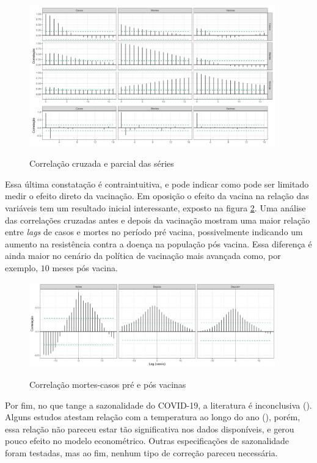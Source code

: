 \documentclass[
    article,
	12pt,				%
	oneside,			%
	a4paper,			%
	english,			%
	brazil,				%
	hyperref = {colorlinks, citecolor=c1d, linkcolor=c2d, urlcolor=c3d, colorlinks}
	]{abntex2}
\begin{document}
\begin{figure}[H]
    \centering
    \caption{Correlação cruzada e parcial das séries}
    \includegraphics[width = 0.95\textwidth]{Figuras/stat_acf.png}
    \label{fig:acfall}
\end{figure}

Essa última constatação é contraintuitiva, e pode indicar como pode ser limitado medir o efeito direto da vacinação. Em oposição o efeito da vacina na relação das variáveis tem um resultado inicial interessante, exposto na figura \ref{fig:ccfad}. Uma análise das correlações cruzadas antes e depois da vacinação mostram uma maior relação entre \textit{lags} de casos e mortes no período pré vacina, possivelmente indicando um aumento na resistência contra a doença na população pós vacina. Essa diferença é ainda maior no cenário da política de vacinação mais avançada como, por exemplo, $10$ meses pós vacina.

\begin{figure}[H]
    \centering
    \caption{Correlação mortes-casos pré e pós vacinas}
    \includegraphics[width = 0.95\textwidth]{Figuras/stat_ba.png}
    \label{fig:ccfad}
\end{figure}

Por fim, no que tange a sazonalidade do COVID-19, a literatura é inconclusiva (\cite{Byun2021}). Alguns estudos atestam relação com a temperatura ao longo do ano (\cite{Wiemken2023}), porém, essa relação não pareceu estar tão significativa nos dados disponíveis, e gerou pouco efeito no modelo econométrico. Outras especificações de sazonalidade foram testadas, mas ao fim, nenhum tipo de correção pareceu necessária.
\end{document}
